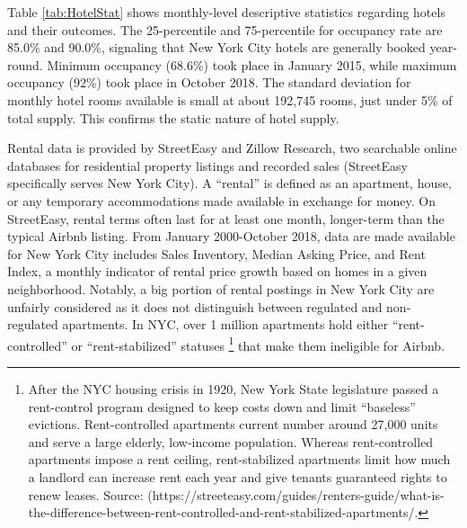 \documentclass[12pt]{article}
\begin{document}
			\par
			Table \ref{tab:HotelStat} shows monthly-level descriptive statistics regarding hotels and their outcomes. The 25-percentile and 75-percentile for occupancy rate are 85.0\% and 90.0\%, signaling that New York City hotels are generally booked year-round. Minimum occupancy (68.6\%) took place in January 2015, while maximum occupancy (92\%) took place in October 2018. The standard deviation for monthly hotel rooms available is small at about 192,745 rooms, just under 5\% of total supply. This confirms the static nature of hotel supply.   
			
			\par
			Rental data is provided by StreetEasy and Zillow Research, two searchable online databases for residential property listings and recorded sales (StreetEasy specifically serves New York City). A “rental” is defined as an apartment, house, or any temporary accommodations made available in exchange for money. On StreetEasy, rental terms often last for at least one month, longer-term than the typical Airbnb listing. From January 2000-October 2018, data are made available for New York City includes Sales Inventory, Median Asking Price, and Rent Index, a monthly indicator of rental price growth based on homes in a given neighborhood. Notably, a big portion of rental postings in New York City are unfairly considered as it does not distinguish between regulated and non-regulated apartments. In NYC, over 1 million apartments hold either “rent-controlled” or “rent-stabilized” statuses \footnote{After the NYC housing crisis in 1920, New York State legislature passed a rent-control program designed to keep costs down and limit “baseless” evictions. Rent-controlled apartments current number around 27,000 units and serve a large elderly, low-income population. Whereas rent-controlled apartments impose a rent ceiling, rent-stabilized apartments limit how much a landlord can increase rent each year and give tenants guaranteed rights to renew leases. Source: (https://streeteasy.com/guides/renters-guide/what-is-the-difference-between-rent-controlled-and-rent-stabilized-apartments/.} that make them ineligible for Airbnb.
			
\end{document}
